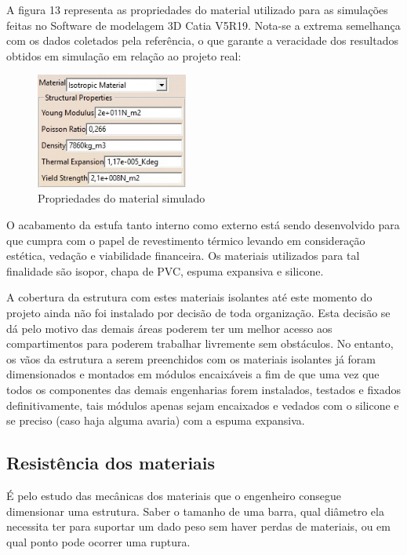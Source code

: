 A figura 13 representa as propriedades do material utilizado para as simulações feitas no Software de modelagem 3D Catia V5R19. Nota-se a extrema semelhança com os dados coletados pela referência, o que garante a veracidade dos resultados obtidos em simulação em relação ao projeto real:

\begin{figure}[H]
	\centering
	\includegraphics[width=5cm]{figuras/propriedade_material.jpg}
	\caption{Propriedades do material simulado} \label{propriedade_material}
\end{figure}

O acabamento da estufa tanto interno como externo está sendo desenvolvido para que cumpra com o papel de revestimento térmico  levando em consideração estética, vedação e viabilidade financeira. Os materiais utilizados para tal finalidade são isopor, chapa de PVC, espuma expansiva e silicone.

A cobertura da estrutura com estes materiais isolantes até este momento do projeto ainda não foi instalado por decisão de toda organização. Esta decisão se dá pelo motivo das demais áreas poderem ter um melhor acesso aos compartimentos para poderem trabalhar livremente sem obstáculos. No entanto, os vãos da estrutura a serem preenchidos com os materiais isolantes já foram dimensionados e montados em módulos encaixáveis a fim de que uma vez que todos os componentes das demais engenharias forem instalados, testados e fixados definitivamente, tais módulos apenas sejam encaixados e vedados com o silicone e se preciso (caso haja alguma avaria) com a espuma expansiva. 

\subsection{Resistência dos materiais}

É pelo estudo das mecânicas dos materiais que o engenheiro consegue dimensionar uma estrutura. Saber o tamanho de uma barra, qual diâmetro ela necessita ter para suportar um dado peso sem haver perdas de materiais, ou em qual ponto pode ocorrer uma ruptura. 

